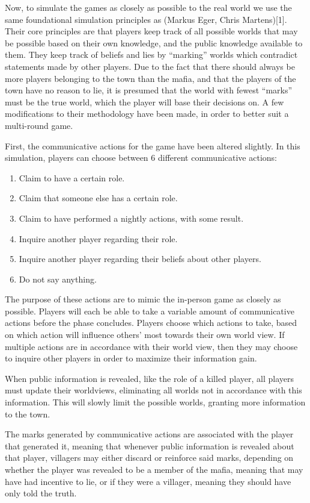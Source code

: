 Now, to simulate the games as closely as possible to the real world we use the
same foundational simulation principles as (Markus Eger, Chris Martens)[1].
Their core principles are that players keep track of all possible worlds that
may be possible based on their own knowledge, and the public knowledge
available to them. They keep track of beliefs and lies by “marking” worlds
which contradict statements made by other players. Due to the fact that there
should always be more players belonging to the town than the mafia, and that
the players of the town have no reason to lie, it is presumed that the world
with fewest “marks” must be the true world, which the player will base their
decisions on. A few modifications to their methodology have been made, in order
to better suit a multi-round game.

First, the communicative actions for the game have been altered slightly. In
this simulation, players can choose between 6 different communicative actions:

\begin{enumerate}
    \item Claim to have a certain role.
    \item Claim that someone else has a certain role.
    \item Claim to have performed a nightly actions, with some result.
    \item Inquire another player regarding their role.
    \item Inquire another player regarding their beliefs about other players.
    \item Do not say anything.
\end{enumerate}
The purpose of these actions are to mimic the in-person game as closely as
possible. Players will each be able to take a variable amount of communicative
actions before the
phase concludes. Players choose which actions to take, based on which action
will influence others’ most towards their own world view. If multiple actions
are in accordance with their world view, then they may choose to inquire other
players in order to maximize their information gain.

When public information is revealed, like the role of a killed player, all
players must update their worldviews, eliminating all worlds not in accordance
with this information. This will slowly limit the possible worlds, granting
more information to the town.

The marks generated by communicative actions are associated with the player
that generated it, meaning that whenever public information is revealed about
that player, villagers may either discard or reinforce said marks, depending on
whether the player was revealed to be a member of the mafia, meaning that may
have had incentive to lie, or if they were a villager, meaning they should have
only told the truth.

